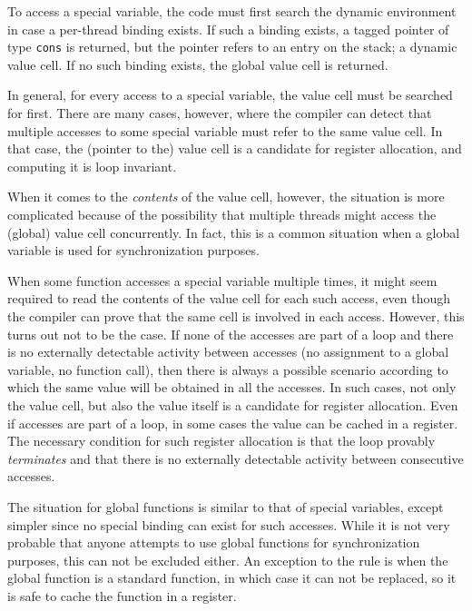 To access a special variable, the code must first search the dynamic
environment in case a per-thread binding exists.  If such a binding
exists, a tagged pointer of type \texttt{cons} is returned, but the
pointer refers to an entry on the stack; a dynamic value cell.  If no
such binding exists, the global value cell is returned.

In general, for every access to a special variable, the value cell
must be searched for first.  There are many cases, however, where the
compiler can detect that multiple accesses to some special variable
must refer to the same value cell.  In that case, the (pointer to the)
value cell is a candidate for register allocation, and computing it is
loop invariant.

When it comes to the \emph{contents} of the value cell, however, the
situation is more complicated because of the possibility that multiple
threads might access the (global) value cell concurrently.  In fact,
this is a common situation when a global variable is used for
synchronization purposes.

When some function accesses a special variable multiple times, it
might seem required to read the contents of the value cell for each
such access, even though the compiler can prove that the same cell is
involved in each access.  However, this turns out not to be the case.
If none of the accesses are part of a loop and there is no externally
detectable activity between accesses (no assignment to a global
variable, no function call), then there is always a possible scenario
according to which the same value will be obtained in all the
accesses.  In such cases, not only the value cell, but also the value
itself is a candidate for register allocation.  Even if accesses are
part of a loop, in some cases the value can be cached in a register.
The necessary condition for such register allocation is that the loop
provably \emph{terminates} and that there is no externally detectable
activity between consecutive accesses.

The situation for global functions is similar to that of special
variables, except simpler since no special binding can exist for such
accesses.  While it is not very probable that anyone attempts to use
global functions for synchronization purposes, this can not be
excluded either.  An exception to the rule is when the global function
is a standard \commonlisp{} function, in which case it can not be replaced, so
it is safe to cache the function in a register.

